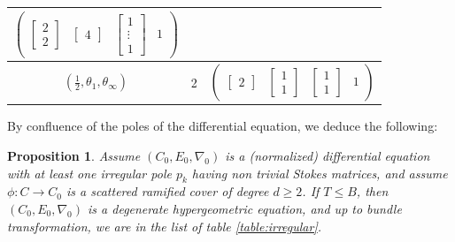 \documentclass[12]{amsart}
\newtheorem{prop}[thm]{Proposition}
\begin{document}
\begin{table}[h]
\begin{center}
\begin{tabular}{|c|c|c|}
$\begin{pmatrix}  \left[\begin{matrix}2\\2\end{matrix}\right] & \left[\begin{matrix}4\end{matrix}\right] & \left[\begin{matrix}1\\ \vdots\\1\end{matrix}\right] & 1\end{pmatrix}$ \\
\hline
$( \frac{1}{2}, \theta_1, \theta_\infty)$ & 2 &
$\begin{pmatrix}  \left[\begin{matrix}2\end{matrix}\right] & \left[\begin{matrix}1\\1\end{matrix}\right] & \left[\begin{matrix}1\\ 1\end{matrix}\right] & 1\end{pmatrix}$ \\
\hline\end{tabular}
\end{center}
\label{table:logarithmic}
\end{table}




By confluence of the poles of the differential equation, we deduce the following:

\begin{prop}\label{prop:classificationIrreg}
Assume $(C_0,E_0,\nabla_0)$ is a (normalized) differential equation
with at least one irregular pole $p_k$ having non trivial Stokes matrices, and assume 
$\phi:C\to C_0$ is a scattered ramified cover of degree $d\ge 2$. If $T\le B$, 
then $(C_0,E_0,\nabla_0)$ is a degenerate hypergeometric equation,
and up to bundle transformation, we are
in the list of table \ref{table:irregular}.
\end{prop}
\end{document}
